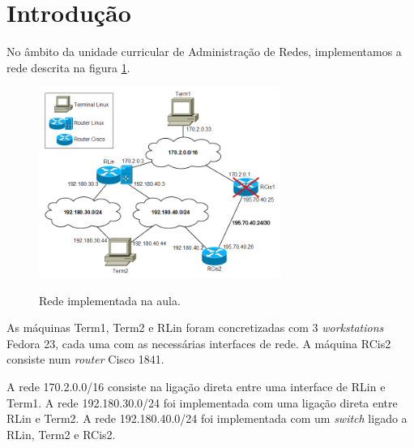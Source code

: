 \section*{Introdução}

No âmbito da unidade curricular de Administração de Redes, implementamos a rede descrita na figura \ref{fig:rede}.

\begin{figure}[h]
\centering
\includegraphics[width=0.7\textwidth]{rede.png}
\label{fig:rede}
\caption{Rede implementada na aula.}
\end{figure}

As máquinas \textsf{Term1}, \textsf{Term2} e \textsf{RLin} foram concretizadas com 3 \emph{workstations} Fedora 23, cada uma com as necessárias interfaces de rede. A máquina \textsf{RCis2} consiste num \emph{router} Cisco 1841.

A rede \textsf{170.2.0.0/16} consiste na ligação direta entre uma interface de \textsf{RLin} e \textsf{Term1}.
A rede \textsf{192.180.30.0/24} foi implementada com uma ligação direta entre \textsf{RLin} e \textsf{Term2}.
A rede \textsf{192.180.40.0/24} foi implementada com um \emph{switch} ligado a \textsf{RLin}, \textsf{Term2} e \textsf{RCis2}. 
